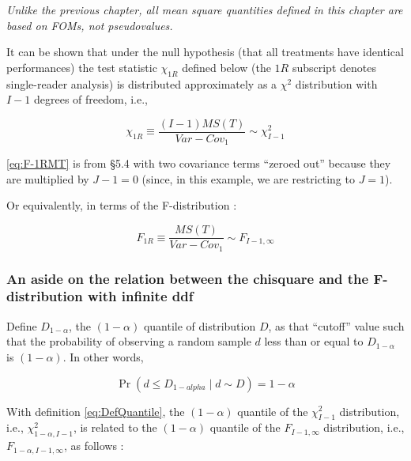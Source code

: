 \documentclass[
]{book}
\begin{document}
\emph{Unlike the previous chapter, all mean square quantities defined in this chapter are based on FOMs, not pseudovalues.}

It can be shown that under the null hypothesis (that all treatments have identical performances) the test statistic \(\chi_{1R}\) defined below (the \(1R\) subscript denotes single-reader analysis) is distributed approximately as a \(\chi^2\) distribution with \(I-1\) degrees of freedom, i.e.,

\begin{equation}
\chi_{1R} \equiv \frac{(I-1)MS(T)}{Var-Cov_1} \sim \chi_{I-1}^{2}
\label{eq:F-1RMT}
\end{equation}

\eqref{eq:F-1RMT} is from §5.4 \citep{RN1865} with two covariance terms ``zeroed out'' because they are multiplied by \(J-1 = 0\) (since, in this example, we are restricting to \(J=1\)).

Or equivalently, in terms of the F-distribution \citep{RN1772}:

\begin{equation}
F_{1R} \equiv \frac{MS(T)}{Var-Cov_1} \sim F_{I-1, \infty}
\label{eq:DefF-1RMT}
\end{equation}

\hypertarget{an-aside-on-the-relation-between-the-chisquare-and-the-f-distribution-with-infinite-ddf}{%
\subsubsection{An aside on the relation between the chisquare and the F-distribution with infinite ddf}\label{an-aside-on-the-relation-between-the-chisquare-and-the-f-distribution-with-infinite-ddf}}

Define \(D_{1-\alpha}\), the \((1-\alpha)\) quantile of distribution \(D\), as that ``cutoff'' value such that the probability of observing a random sample \(d\) less than or equal to \(D_{1-\alpha}\) is \((1-\alpha)\). In other words,

\begin{equation}
\Pr(d\leq D_{1-alpha} \mid d \sim D)=1-\alpha
\label{eq:DefQuantile}
\end{equation}

With definition \eqref{eq:DefQuantile}, the \((1-\alpha)\) quantile of the \(\chi_{I-1}^2\) distribution, i.e., \(\chi_{1-\alpha,I-1}^2\), is related to the \((1-\alpha)\) quantile of the \(F_{I-1,\infty}\) distribution, i.e., \(F_{1-\alpha,I-1,\infty}\), as follows \citep[see][Eq. 22]{RN1772}:
\end{document}
